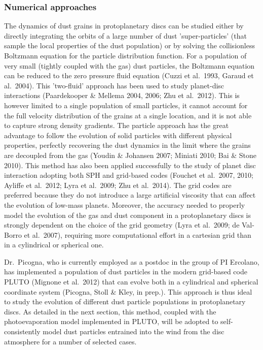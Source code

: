 \documentclass[10pt,fleqn,twoside]{article}
\begin{document}
\subsubsection{Numerical approaches}

The dynamics of dust grains in protoplanetary discs can be studied
either by directly integrating the orbits of a large number of dust
'super-particles' (that sample the local properties of the dust
population) or by solving the collisionless Boltzmann equation for the
particle distribution function. For a population of very small
(tightly coupled with the gas) dust particles, the Boltzmann equation
can be reduced to the zero pressure fluid equation (Cuzzi et al.\ 1993,
Garaud et al.\ 2004). This 'two-fluid' approach has been used to study
planet-disc interactions (Paardekooper \& Mellema 2004, 2006; Zhu et
al.\ 2012). This is however limited to a single population of
small particles, it cannot account for the full velocity distribution
of the grains at a single location, and it is not able to capture
strong density gradients. The particle approach has the great
advantage to follow the evolution of solid particles with different
physical properties, perfectly recovering the dust dynamics in the
limit where the grains are decoupled from the gas (Youdin \& Johansen
2007; Miniati 2010; Bai \& Stone 2010). This method has also been
applied successfully to the study of planet disc interaction adopting
both SPH and grid-based codes (Fouchet et al.\ 2007, 2010; Ayliffe et
al.\ 2012; Lyra et al.\ 2009; Zhu et al.\ 2014). The grid codes are
preferred because they do not introduce a large artificial viscosity
that can affect the evolution of low-mass planets. Moreover, the
accuracy needed to properly model the evolution of the gas and dust
component in a protoplanetary discs is strongly dependent on the
choice of the grid geometry (Lyra et al.\ 2009; de Val-Borro et
al.\ 2007), requiring more computational effort in a cartesian grid
than in a cylindrical or spherical one. 

Dr.\ Picogna, who is currently employed as a postdoc in the group of PI
Ercolano, has implemented a population of dust
particles in the modern grid-based code PLUTO (Mignone et al.\ 2012)
that can evolve both in a cylindrical and spherical coordinate system
(Picogna, Stoll \& Kley, in prep.). This approach is thus ideal to
study the evolution of different dust particle populations in
protoplanetary discs. As detailed in the next section, this method,
coupled with the photoevaporation model implemented in PLUTO, will be
adopted to self-consistently model dust particles entrained into the
wind from the disc atmosphere for a number of selected cases.
\end{document}

